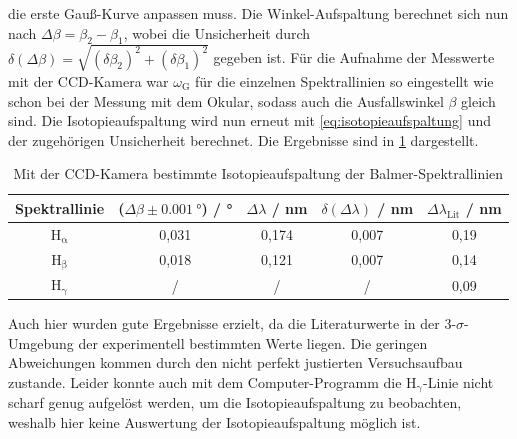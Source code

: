 die erste Gauß-Kurve anpassen muss.\newline
\indent Die Winkel-Aufspaltung berechnet sich nun nach $\Delta \beta = \beta_2 - \beta_1$, wobei die Unsicherheit durch $\delta (\Delta \beta) = \sqrt{(\delta \beta_2)^2 + (\delta \beta_1)^2}$
gegeben ist. Für die Aufnahme der Messwerte mit der CCD-Kamera war $\omega_{\mathrm{G}}$ für die einzelnen Spektrallinien so eingestellt wie schon bei der Messung mit dem Okular, sodass auch die Ausfallswinkel $\beta$ gleich sind.
Die Isotopieaufspaltung wird nun erneut mit \ref{eq:isotopieaufspaltung} und der zugehörigen Unsicherheit berechnet. Die Ergebnisse sind in \cref{tab:aufspaltung_balmer_2} dargestellt.
\begin{table}[H]
    \centering
    \caption{Mit der CCD-Kamera bestimmte Isotopieaufspaltung der Balmer-Spektrallinien}
    \begin{tabular}{c|c|c|c|c}
        Spektrallinie & ($\Delta \beta \pm \SI{0,001}{\degree}$) / \unit{\degree} & $\Delta \lambda$ / \unit{\nano \meter} & $\delta (\Delta \lambda)$ / \unit{\nano \meter} & $\Delta \lambda_{\mathrm{Lit}}$ / \unit{\nano \meter} \\
        \hline
        $\mathrm{H_{\alpha}}$ & 0,031 & 0,174 & 0,007 & 0,19 \\
        $\mathrm{H_{\beta}}$ & 0,018 & 0,121 & 0,007 & 0,14 \\
        $\mathrm{H_{\gamma}}$ & / & / & / & 0,09
    \end{tabular}\label{tab:aufspaltung_balmer_2}
\end{table} Auch hier wurden gute Ergebnisse erzielt, da die Literaturwerte in der 3-$\sigma$-Umgebung der experimentell bestimmten Werte liegen. Die geringen Abweichungen kommen durch
den nicht perfekt justierten Versuchsaufbau zustande. Leider konnte auch mit dem Computer-Programm die $\mathrm{H_{\gamma}}$-Linie nicht scharf genug aufgelöst werden, um
die Isotopieaufspaltung zu beobachten, weshalb hier keine Auswertung der Isotopieaufspaltung möglich ist.


